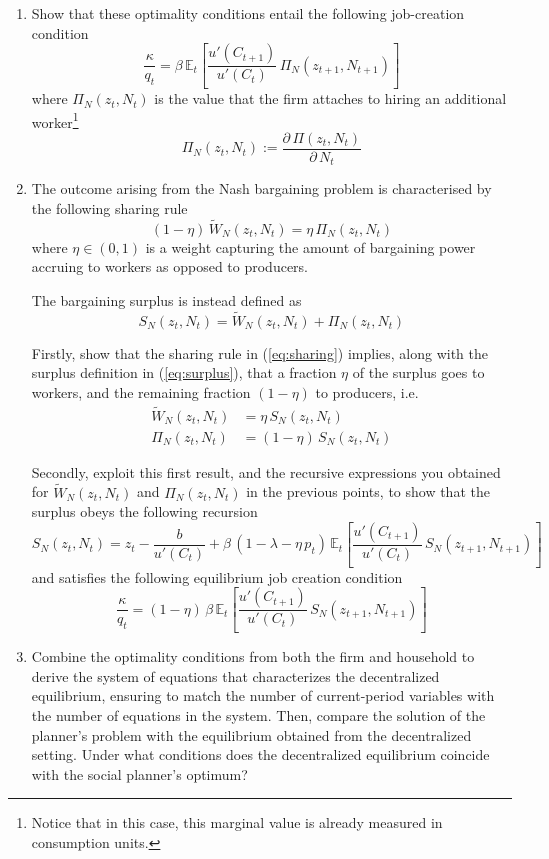 \documentclass[a4paper,11pt]{article}
\begin{document}
\begin{enumerate}
\item Show that these optimality conditions entail the following job-creation condition
$$ \frac{\kappa}{q_t} = \beta\,\mathbb{E}_t\left[\frac{u'(C_{t+1})}{u'(C_t)}\, \Pi_N(z_{t+1},N_{t+1})\right] $$
where $\Pi_N(z_t,N_t)$ is the value that the firm attaches to hiring an additional worker\footnote{Notice that in this case, this marginal value is already measured in consumption units.}
$$ \Pi_N(z_t,N_t) := \frac{\partial\,\Pi(z_{t},N_{t})}{\partial\,N_t} $$

\item The outcome  arising from the Nash bargaining problem is characterised by the following sharing rule
\begin{equation}\label{eq:sharing}
    (1-\eta)\,\widetilde{W}_N(z_t,N_t) = \eta\,\Pi_N(z_t,N_t)
\end{equation}
where $\eta\in(0,1)$ is a weight capturing the amount of bargaining power accruing to workers as opposed to producers.

The bargaining surplus is instead defined as
\begin{equation}\label{eq:surplus}
    S_N(z_t,N_t) = \widetilde{W}_N(z_t,N_t) + \Pi_N(z_t,N_t)
\end{equation}

Firstly, show that the sharing rule in (\ref{eq:sharing}) implies, along with the surplus definition in (\ref{eq:surplus}), that a fraction $\eta$ of the surplus goes to workers, and the remaining fraction $(1-\eta)$ to producers, i.e.
\begin{align*}
    \widetilde{W}_N(z_t,N_t)    &=  \eta\,S_N(z_t,N_t)
    \\
    \Pi_N(z_t,N_t)              &=  (1-\eta)\,S_N(z_t,N_t)
\end{align*}

Secondly, exploit this first result, and the recursive expressions you obtained for $\widetilde{W}_N(z_t,N_t)$ and $\Pi_N(z_t,N_t)$ in the previous points, to show that the surplus obeys the following recursion
$$ S_N(z_t,N_t) = z_t - \frac{b}{u'(C_t)} + \beta\,\left(1-\lambda - \eta\,p_t\right)\,\mathbb{E}_t\left[\frac{u'(C_{t+1})}{u'(C_t)}\, S_N(z_{t+1},N_{t+1})\right] $$
and satisfies the following equilibrium job creation condition
$$ \frac{\kappa}{q_t} = (1-\eta)\, \beta\,\mathbb{E}_t\left[\frac{u'(C_{t+1})}{u'(C_t)}\, S_N(z_{t+1},N_{t+1})\right] $$


\item Combine the optimality conditions from both the firm and household to derive the system of equations that characterizes the decentralized equilibrium, ensuring to match the number of current-period variables with the number of equations in the system. Then, compare the solution of the planner’s problem with the equilibrium obtained from the decentralized setting. Under what conditions does the decentralized equilibrium coincide with the social planner’s optimum?


\end{enumerate}
\end{document}
